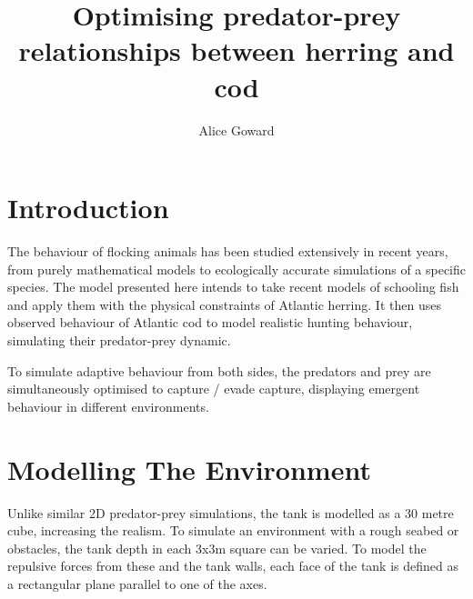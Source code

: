 \documentclass[12pt]{article}
\title{Optimising predator-prey relationships between herring and cod}
\author{Alice Goward}
\begin{document}
\maketitle
\setcounter{tocdepth}{2}
\tableofcontents
\newpage
\section{Introduction}
The behaviour of flocking animals has been studied extensively in recent years, from purely mathematical models\supercite{reynolds1987flocks} to ecologically accurate simulations of a specific species\supercite{Giske2008_EmergingSchoolStructures}. The model presented here intends to take recent models of schooling fish and apply them with the physical constraints of Atlantic herring. It then uses observed behaviour of Atlantic cod to model realistic hunting behaviour, simulating their predator-prey dynamic.\par
To simulate adaptive behaviour from both sides, the predators and prey are simultaneously optimised to capture / evade capture, displaying emergent behaviour in different environments.
\section{Modelling The Environment}
Unlike similar 2D predator-prey simulations\supercite{HartonoNguyenTa2024}, the tank is modelled as a 30 metre cube, increasing the realism. To simulate an environment with a rough seabed or obstacles, the tank depth in each 3x3m square can be varied. To model the repulsive forces from these and the tank walls, each face of the tank is defined as a rectangular plane parallel to one of the axes.
\end{document}
